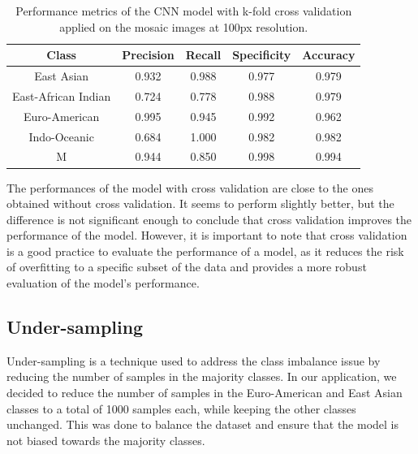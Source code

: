 \begin{table}[H]
	\centering
	\begin{tabular}{|c|c|c|c|c|}
		\hline
		\textbf{Class}      & \textbf{Precision} & \textbf{Recall} & \textbf{Specificity} & \textbf{Accuracy} \\
		\hline
		East Asian          & 0.932              & 0.988           & 0.977                & 0.979             \\
		East-African Indian & 0.724              & 0.778           & 0.988                & 0.979             \\
		Euro-American       & 0.995              & 0.945           & 0.992                & 0.962             \\
		Indo-Oceanic        & 0.684              & 1.000           & 0.982                & 0.982             \\
		M                   & 0.944              & 0.850           & 0.998                & 0.994             \\
		\hline
	\end{tabular}
	\caption{Performance metrics of the CNN model with k-fold cross validation applied on the mosaic images at 100px resolution.}
	\label{tab:kfold_performance_metrics_mosaic}
\end{table}

The performances of the model with cross validation are close to the ones obtained without cross validation. It seems to perform slightly
better, but the difference is not significant enough to conclude that cross validation improves the performance of the model. However, it is
important to note that cross validation is a good practice to evaluate the performance of a model, as it reduces the risk of overfitting
to a specific subset of the data and provides a more robust evaluation of the model's performance.

\subsection{Under-sampling}
\label{subsec:under_sampling}

Under-sampling is a technique used to address the class imbalance issue by reducing the number of samples in the majority classes. In our
application, we decided to reduce the number of samples in the Euro-American and East Asian classes to a total of 1000 samples each, while keeping
the other classes unchanged. This was done to balance the dataset and ensure that the model is not biased towards the majority classes.

